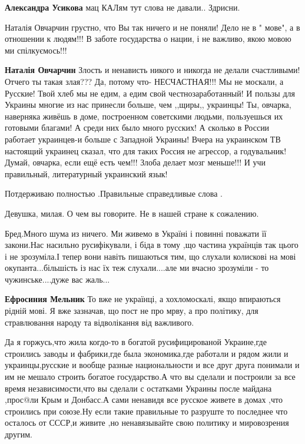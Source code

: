 \begin{itemize}
\begin{itemize}
\textbf{Александра Усикова} мац КАЛям тут слова не давали.. Здрисни.

Наталія Овчарчин грустно, что Вы так ничего и не поняли! Дело не в " мове", а в
отношении к людям!!! В заботе государства о нации, і не важливо, якою мовою ми
спілкуємось!!!

\textbf{Наталія Овчарчин} Злость и ненависть никого и никогда не делали
счастливыми! Отчего ты такая злая??? Да, потому что- НЕСЧАСТНАЯ!!! Мы не
москали, а Русские! Твой хлеб мы не едим, а едим свой честнозаработанный! И
пользы для Украины многие из нас принесли больше, чем ,,щиры,, украинцы! Ты,
овчарка, наверняка живёшь в доме, построенном советскими людьми, пользуешься их
готовыми благами! А среди них было много русских! А сколько в России работает
украинцев-и больше с Западной Украины! Вчера на украинском ТВ настоящий
украинец сказал, что для таких Россия не агрессор, а годувальник! Думай,
овчарка, если ещё есть чем!!! Злоба делает мозг меньше!!! И учи правильный,
литературный украинский язык!
\end{itemize}


Потдерживаю полностью .Правильные справедливые слова .


Девушка, милая. О чем вы говорите. Не в нашей стране к сожалению.


Бред.Много шума из ничего. Ми живемо в Україні і повинні поважати її закони.Нас
насильно русифікували, і біда в тому ,що частина українців так цього і не
зрозуміла.І тепер вони навіть пишаються тим, що слухали колискові на мові
окупанта...більшість із нас їх теж слухали....але ми вчасно зрозуміли - то
чужинське....дуже вас жаль...

\begin{itemize}

\textbf{Ефросиния Мельник} То вже не українці, а хохломоскалі, якщо впираються рідній мові.
Я вже зазначав, що пост не про мрву, а про політику, для стравлювання народу та
відволікання від важливого.


Да я горжусь,что жила когдо-то в богатой русифицированой Украине,где строились заводы и фабрики,где была экономика,где работали и рядом жили и украинцы,русские и вообще разные национальности и все друг друга понимали и им не мешало строить богатое государство.А что вы сделали и построили за все время независимости,что вы сделали с остатками Украины после майдана ,прос@ли Крым и Донбасс.А сами ненавидя все русское живете в домах ,что строились при союзе.Ну если такие правильные то разруште то последнее что осталось от СССР,и живите ,но ненавязывайте свою политику и мировозрения другим.


\end{itemize}
\end{itemize}
